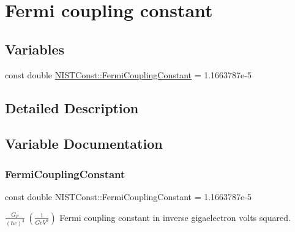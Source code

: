 \hypertarget{group___n_i_s_t_const-_fermi_coupling_constant}{}\section{Fermi coupling constant}
\label{group___n_i_s_t_const-_fermi_coupling_constant}
\subsection*{Variables}
\begin{DoxyCompactItemize}
\item 
const double \hyperlink{group___n_i_s_t_const-_fermi_coupling_constant_ga0348e7c9835697c05fa7f68029bfb15a}{N\+I\+S\+T\+Const\+::\+Fermi\+Coupling\+Constant} = 1.\+1663787e-\/5
\end{DoxyCompactItemize}


\subsection{Detailed Description}


\subsection{Variable Documentation}
\mbox{\label{group___n_i_s_t_const-_fermi_coupling_constant_ga0348e7c9835697c05fa7f68029bfb15a}} 
\subsubsection{\texorpdfstring{Fermi\+Coupling\+Constant}{FermiCouplingConstant}}
{\footnotesize\ttfamily const double N\+I\+S\+T\+Const\+::\+Fermi\+Coupling\+Constant = 1.\+1663787e-\/5}

$\frac{G_F}{(\hbar c)^3} \ (\frac{1}{GeV^2})$ Fermi coupling constant in inverse gigaelectron volts squared. 